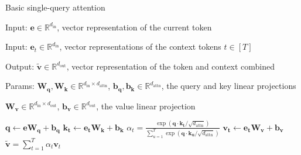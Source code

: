 \documentclass[12pt,aspectratio=169,handout]{beamer}
\begin{document}
\begin{frame}{Basic single-query attention}

\begin{minipage}[t][10cm][t]{15cm}
	
Input: $\bm{e} \in \mathbb{R}^{d_\text{in}}$, vector representation of the current token

Input: $\bm{e}_t \in \mathbb{R}^{d_\text{in}}$, vector representations of the context tokens $t \in [T]$

Output: $\bm{\tilde v} \in \mathbb{R}^{d_\text{out}}$, vector representation of the token and context combined

Params: $\bm{W_q}, \bm{W_k} \in \mathbb{R}^{d_\text{in} \times d_\text{attn}}$, $\bm{b_q}, \bm{b_k} \in \mathbb{R}^{d_\text{attn}}$, the query and key linear projections

$\bm{W_v} \in \mathbb{R}^{d_\text{in} \times d_\text{out}}$, $ \bm{b_v} \in \mathbb{R}^{d_\text{out}}$, the value linear projection

\begin{algorithmic}[1]
\State $\bm{q} \gets \bm{e} \bm{W_q} + \bm{b_q}$
\State $\bm{k_t} \gets \bm{e_t} \bm{W_k} + \bm{b_k}$
\State $\alpha_{t} = \frac{
	\exp(\bm{q} \cdot \bm{k_t} / \sqrt{d_{\text{attn}}})
}{
	\sum_{u = 1}^{T}\exp(\bm{q} \cdot \bm{k_u} / \sqrt{d_{\text{attn}}})
}$
\State $\bm{v_t} \gets \bm{e_t} \bm{W_v} + \bm{b_v}$
\EndFor
\State \Return $\bm{\tilde v} = \sum_{t=1}^T \alpha_t \bm{v}_t$
\EndFunction
\end{algorithmic}
	
\end{minipage}
\end{frame}
\end{document}
